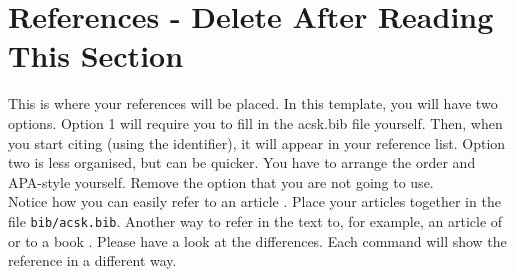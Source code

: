 \newpage %
\section*{References - Delete After Reading This Section}
\noindent This is where your references will be placed. In this template, you will have two options. Option 1 will require you to fill in the acsk.bib file yourself. Then, when you start citing (using the identifier), it will appear in your reference list. Option two is less organised, but can be quicker. You have to arrange the order and APA-style yourself. Remove the option that you are not going to use.\\

\noindent Notice how you can easily refer to an article \citep{Zako94A}. Place your articles together in the file {\tt bib/acsk.bib}. Another way to refer in the text to, for example, an
article of \citet{Engl82A} or to a book \citep{Tayl86A}. Please have a look at the differences. Each command will show the reference in a different way. \\









\printbibliography %











\iffalse 
\begin{thebibliography}{9} %
\bibitem{latexcompanion} %
Michel Goossens, Frank Mittelbach, and Alexander Samarin. 
\textit{The \LaTeX\ Companion}. 
Addison-Wesley, Reading, Massachusetts, 1993.

\bibitem{einstein} 
Albert Einstein. 
\textit{Zur Elektrodynamik bewegter K{\"o}rper}. (German) 
[\textit{On the electrodynamics of moving bodies}]. 
Annalen der Physik, 322(10):891–921, 1905.

\bibitem{knuthwebsite} 
Knuth: Computers and Typesetting,
\\\texttt{http://www-cs-faculty.stanford.edu/\~{}uno/abcde.html}
\end{thebibliography} 
\fi
